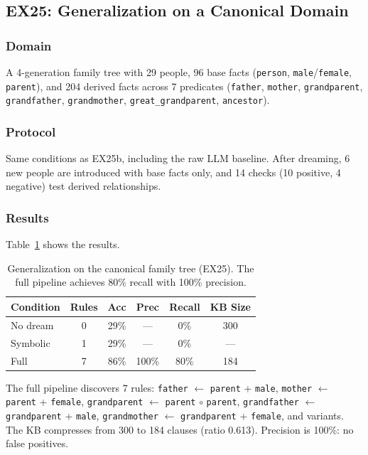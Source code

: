 \documentclass[10pt,conference]{IEEEtran}
\begin{document}
\subsection{EX25: Generalization on a Canonical Domain}
\label{sec:ex25}

\subsubsection{Domain}
A 4-generation family tree with 29 people, 96 base facts (\texttt{person}, \texttt{male}/\texttt{female}, \texttt{parent}), and 204 derived facts across 7 predicates (\texttt{father}, \texttt{mother}, \texttt{grandparent}, \texttt{grandfather}, \texttt{grandmother}, \texttt{great\_grandparent}, \texttt{ancestor}).

\subsubsection{Protocol}
Same conditions as EX25b, including the raw LLM baseline. After dreaming, 6 new people are introduced with base facts only, and 14 checks (10 positive, 4 negative) test derived relationships.

\subsubsection{Results}

Table~\ref{tab:family_generalization} shows the results.

\begin{table}[t]
\centering
\caption{Generalization on the canonical family tree (EX25). The full pipeline achieves 80\% recall with 100\% precision.}
\label{tab:family_generalization}
\begin{tabular}{lccccc}
\toprule
\textbf{Condition} & \textbf{Rules} & \textbf{Acc} & \textbf{Prec} & \textbf{Recall} & \textbf{KB Size} \\
\midrule
No dream   & 0 & 29\% & ---  & 0\%  & 300 \\
Symbolic   & 1 & 29\% & ---  & 0\%  & --- \\
Full       & 7 & 86\% & 100\% & 80\% & 184 \\
\bottomrule
\end{tabular}
\end{table}

The full pipeline discovers 7 rules: \texttt{father} $\leftarrow$ \texttt{parent} + \texttt{male}, \texttt{mother} $\leftarrow$ \texttt{parent} + \texttt{female}, \texttt{grandparent} $\leftarrow$ \texttt{parent} $\circ$ \texttt{parent}, \texttt{grandfather} $\leftarrow$ \texttt{grandparent} + \texttt{male}, \texttt{grandmother} $\leftarrow$ \texttt{grandparent} + \texttt{female}, and variants. The KB compresses from 300 to 184 clauses (ratio 0.613). Precision is 100\%: no false positives.
\end{document}
